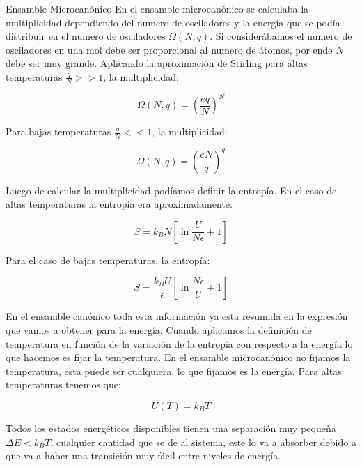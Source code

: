 \documentclass[11pt,fleqn]{book}
\begin{document}
\begin{remark}{Ensamble Microcanónico}
    En el ensamble microcanónico se calculaba la multiplicidad dependiendo del numero de osciladores y la energía que se podía distribuir en el numero de osciladores $\Omega(N,q)$. Si considerábamos el numero de osciladores en una mol debe ser proporcional al numero de átomos, por ende $N$ debe ser muy grande. Aplicando la aproximación de Stirling para altas temperaturas $\frac{q}{N}>>1$, la multiplicidad:
    
    \begin{equation*}
        \Omega(N,q)=\left(\frac{eq}{N}\right)^{N}
    \end{equation*}
    
    Para bajas temperaturas $\frac{q}{N}<<1$, la multiplicidad:
    
    \begin{equation*}
        \Omega(N,q)=\left(\frac{eN}{q}\right)^{q}
    \end{equation*}
    
    Luego de calcular la multiplicidad podíamos definir la entropía. En el caso de altas temperaturas la entropía era aproximadamente:
    
    \begin{equation*}
        S=k_{B}N\left[\ln{\frac{U}{N\epsilon}+1}\right]
    \end{equation*}
    
    Para el caso de bajas temperaturas, la entropía:
    
    \begin{equation*}
        S=\frac{k_{B}U}{\epsilon}\left[\ln{\frac{N\epsilon}{U}+1}\right]
    \end{equation*}

En el ensamble canónico toda esta información ya esta resumida en la expresión que vamos a obtener para la energía. Cuando aplicamos la definición de temperatura en función de la variación de la entropía con respecto a la energía lo que hacemos es fijar la temperatura. En el ensamble microcanónico no fijamos la temperatura, esta puede ser cualquiera, lo que fijamos es la energía. Para altas temperaturas tenemos que:

\begin{equation*}
    U(T)=k_{B}T
\end{equation*}

Todos los estados energéticos disponibles tienen una separación muy pequeña $\Delta E<k_{B}T$, cualquier cantidad que se de al sistema, este lo va a absorber debido a que va a haber una transición muy fácil entre niveles de energía.


\end{remark}
\end{document}
